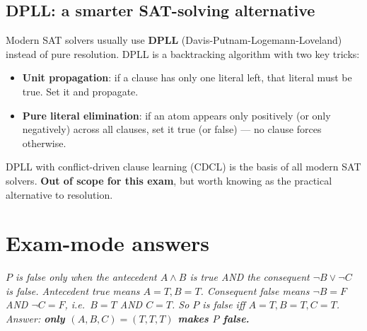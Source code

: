 \documentclass[11pt, a4paper]{article}
\begin{document}
\subsection{DPLL: a smarter SAT-solving alternative}

Modern SAT solvers usually use \textbf{DPLL} (Davis-Putnam-Logemann-Loveland) instead of pure resolution. DPLL is a backtracking algorithm with two key tricks:

\begin{itemize}
  \item \textbf{Unit propagation}: if a clause has only one literal left, that literal must be true. Set it and propagate.
  \item \textbf{Pure literal elimination}: if an atom appears only positively (or only negatively) across all clauses, set it true (or false) — no clause forces otherwise.
\end{itemize}

DPLL with conflict-driven clause learning (CDCL) is the basis of all modern SAT solvers. \textbf{Out of scope for this exam}, but worth knowing as the practical alternative to resolution.

\section{Exam-mode answers}

\begin{exambox}[(MCQ): Consider the propositional logic sentence $P = (A \land B) \rightarrow (\neg B \lor \neg C)$. In which of the following models is $P$ false?]
\textit{$P$ is false only when the antecedent $A \land B$ is true AND the consequent $\neg B \lor \neg C$ is false. Antecedent true means $A = T, B = T$. Consequent false means $\neg B = F$ AND $\neg C = F$, i.e.\ $B = T$ AND $C = T$. So $P$ is false iff $A = T, B = T, C = T$.}\\[0.3em]
\textit{Answer: \textbf{only $(A, B, C) = (T, T, T)$ makes $P$ false.}}
\end{exambox}
\end{document}
